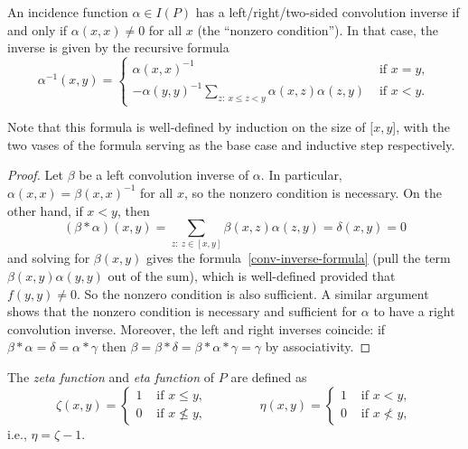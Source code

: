 \begin{proposition} \label{conv-inv}
An incidence function $\alpha\in I(P)$ has a left/right/two-sided convolution inverse if and only if $\alpha(x,x)\neq 0$ for all $x$ (the ``nonzero condition'').  In that case,
the inverse is given by the recursive formula
\begin{equation} \label{conv-inverse-formula}
\alpha^{-1}(x,y)=\begin{cases}
\alpha(x,x)^{-1} & \text{ if } x=y,\\
-\alpha(y,y)^{-1}\sum_{z:\ x\leq z<y}\alpha(x,z)\alpha(z,y) & \text{ if } x<y.
\end{cases}
\end{equation}
\end{proposition}
Note that this formula is well-defined by induction on the size of $[x,y$], with the two vases of the formula serving as the base case and inductive step respectively.
\begin{proof}
Let $\beta$ be a left convolution inverse of $\alpha$.  In particular, $\alpha(x,x)=\beta(x,x)^{-1}$
for all $x$, so the nonzero condition is necessary.  On the other hand, if $x<y$, then
\[(\beta*\alpha)(x,y) = \sum_{z:\ z\in[x,y]}\beta(x,z)\alpha(z,y) = \delta(x,y) = 0\]
and solving for $\beta(x,y)$ gives the formula~\eqref{conv-inverse-formula} (pull the term $\beta(x,y)\alpha(y,y)$ out of the sum), which is well-defined provided that $f(y,y)\neq0$.  So the nonzero condition is also sufficient.  A similar argument shows that the nonzero condition is necessary and sufficient for $\alpha$ to have a right convolution inverse.  Moreover, the left and right inverses coincide: if $\beta*\alpha=\delta=\alpha*\gamma$ then $\beta=\beta*\delta=\beta*\alpha*\gamma=\gamma$ by associativity.
\end{proof}

The \emph{zeta function} and \emph{eta function} of $P$ are defined as
\[
\zeta(x,y) = \begin{cases} 1 & \text{ if } x\leq y,\\ 0 & \text{ if } x\not\leq y ,\end{cases}\qquad\qquad
\eta(x,y) = \begin{cases} 1 & \text{ if } x<y,\\ 0 & \text{ if } x\not<y, \end{cases}
\]
i.e., $\eta=\zeta-1$.

